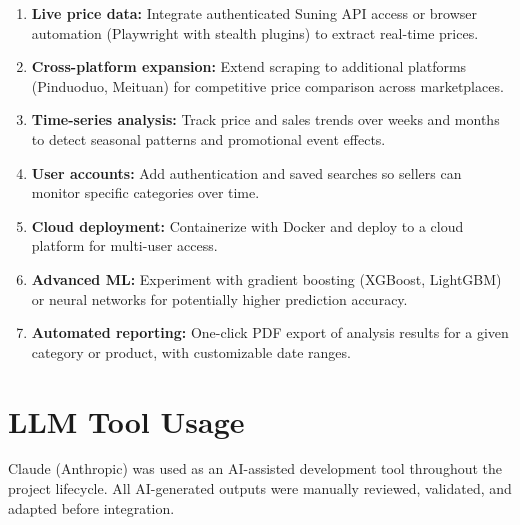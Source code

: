 \documentclass[12pt,a4paper]{report}
\begin{document}
\begin{enumerate}[itemsep=3pt]
  \item \textbf{Live price data:} Integrate authenticated Suning API access or browser automation (Playwright with stealth plugins) to extract real-time prices.
  \item \textbf{Cross-platform expansion:} Extend scraping to additional platforms (Pinduoduo, Meituan) for competitive price comparison across marketplaces.
  \item \textbf{Time-series analysis:} Track price and sales trends over weeks and months to detect seasonal patterns and promotional event effects.
  \item \textbf{User accounts:} Add authentication and saved searches so sellers can monitor specific categories over time.
  \item \textbf{Cloud deployment:} Containerize with Docker and deploy to a cloud platform for multi-user access.
  \item \textbf{Advanced ML:} Experiment with gradient boosting (XGBoost, LightGBM) or neural networks for potentially higher prediction accuracy.
  \item \textbf{Automated reporting:} One-click PDF export of analysis results for a given category or product, with customizable date ranges.
\end{enumerate}

\section{LLM Tool Usage}

Claude (Anthropic) was used as an AI-assisted development tool throughout the project lifecycle. All AI-generated outputs were manually reviewed, validated, and adapted before integration.
\end{document}
